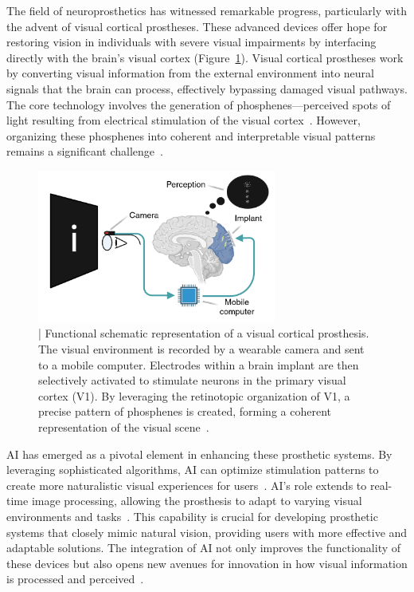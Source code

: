 \documentclass[twocolumn,10pt]{article}
\begin{document}
The field of neuroprosthetics has witnessed remarkable progress, particularly
with the advent of visual cortical prostheses. These advanced devices offer hope
for restoring vision in individuals with severe visual impairments by
interfacing directly with the brain's visual cortex
(Figure~\ref{fig:schematic}). Visual cortical prostheses work by converting
visual information from the external environment into neural signals that the
brain can process, effectively bypassing damaged visual pathways. The core
technology involves the generation of phosphenes---perceived spots of light
resulting from electrical stimulation of the visual
cortex~\parencite{vandergrintenBiologicallyPlausiblePhosphene2024a}. However,
organizing these phosphenes into coherent and interpretable visual patterns
remains a significant challenge~\parencite{merabetWhatBlindnessCan2005}.

\pagestyle{rest} %

\begin{figure}[ht!]
      \centering
      \includegraphics[width=0.7\textwidth]{imgs/visual_cortical_prothesis.png}
      \caption{| Functional schematic representation of a visual cortical
            prosthesis. The visual environment is recorded by a wearable camera
            and sent to a mobile computer. Electrodes within a brain implant are
            then selectively activated to stimulate neurons in the primary
            visual cortex (V1). By leveraging the retinotopic organization of
            V1, a precise pattern of phosphenes is created, forming a coherent
            representation of the visual scene~\parencite{chenShapePerceptionHighchannelcount2020}.}\label{fig:schematic}
\end{figure}

AI has emerged as a pivotal element in enhancing these prosthetic systems. By
leveraging sophisticated algorithms, AI can optimize stimulation patterns to
create more naturalistic visual experiences for
users~\parencite{kriegeskorteDeepNeuralNetworks2015}. AI's role extends to real-time
image processing, allowing the prosthesis to adapt to varying visual
environments and tasks~\parencite{marblestoneIntegrationDeepLearning2016}. This
capability is crucial for developing prosthetic systems that closely mimic
natural vision, providing users with more effective and adaptable solutions. The
integration of AI not only improves the functionality of these devices but also
opens new avenues for innovation in how visual information is processed and
perceived~\parencite{gallettiCorticalConnectionsArea2001}.
\end{document}
